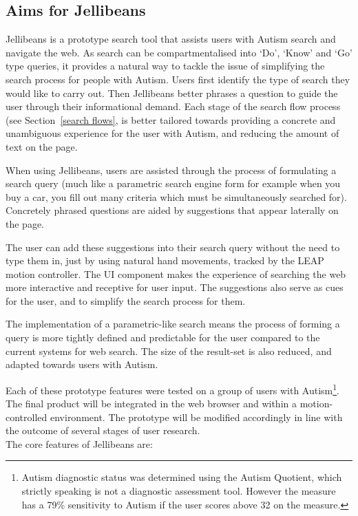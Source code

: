 \documentclass[a4paper, 11pt]{article}
\begin{document}
\subsection {Aims for Jellibeans}
Jellibeans is a prototype search tool that assists users with Autism search and navigate the web. As search can be compartmentalised into `Do', `Know' and `Go' type queries, it provides a natural way to tackle the issue of simplifying the search process for people with Autism. Users first identify the type of search they would like to carry out. Then Jellibeans better phrases a question to guide the user through their informational demand. Each stage of the search flow process (see Section~\ref{search flows}, is better tailored towards providing a concrete and unambiguous experience for the user with Autism, and reducing the amount of text on the page. 

\vspace{5mm}
When using Jellibeans, users are assisted through the process of formulating a search query (much like a parametric search engine form for example when you buy a car, you fill out many criteria which must be simultaneously searched for). Concretely phrased questions are aided by suggestions that appear laterally on the page.

\vspace{5mm}
The user can add these suggestions into their search query without the need to type them in, just by using natural hand movements, tracked by the LEAP motion controller. The UI component makes the experience of searching the web more interactive and receptive for user input. The suggestions also serve as cues for the user, and to simplify the search process for them. 

\vspace{5mm}
The implementation of a parametric-like search means the process of forming a query is more tightly defined and predictable for the user compared to the current systems for web search. The size of the result-set is also reduced, and adapted towards users with Autism.   

\vspace{5mm}
Each of these prototype features were tested on a group of users with Autism\footnote{Autism diagnostic status was determined using the Autism Quotient, which strictly speaking is not a diagnostic assessment tool. However the measure has a 79\% sensitivity to Autism if the user scores above 32 on the measure.}. The final product will be integrated in the web browser and within a motion-controlled environment. The prototype will be modified accordingly in line with the outcome of several stages of user research.\\ The core features of Jellibeans are:
\end{document}
